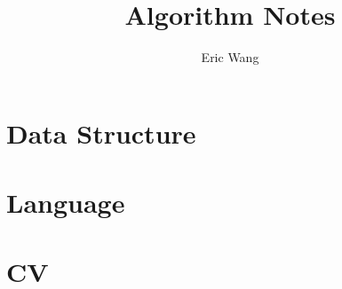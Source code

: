 \documentclass{book}
\begin{document}
\title{Algorithm Notes}
\author{Eric Wang}
\maketitle
\newpage
\tableofcontents
\newpage

\part{Data Structure}




\part{Language}


\part{CV}


\end{document}
